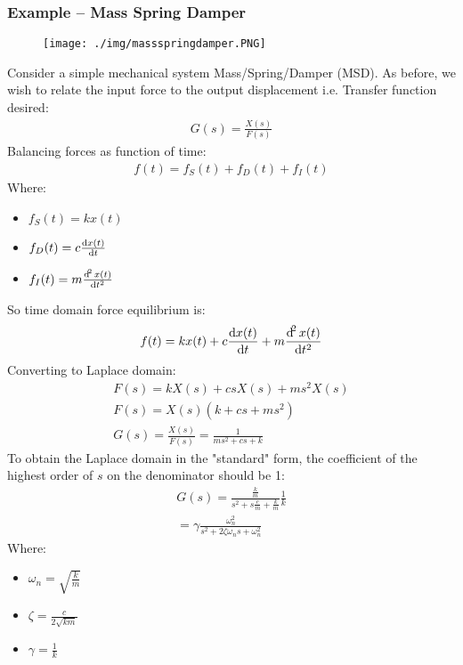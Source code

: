 \subsubsection*{Example – Mass Spring Damper}
\begin{figure}[H]
  \centering
  \texttt{[image: ./img/massspringdamper.PNG]}
\end{figure}
Consider a simple mechanical system Mass/Spring/Damper (MSD). As before, we wish to relate the input force to the output displacement i.e. Transfer function desired:
\begin{gather}
  G(s) = \frac{X(s)}{F(s)}
\end{gather}
Balancing forces as function of time:
\begin{gather}
  f(t) = f_S(t) + f_D(t) + f_I(t)
\end{gather}
Where:
\begin{itemize}
  \item $f_S(t) = kx(t)$
  \item $f_D(t) = c\frac{\dif x(t)}{\dif t}$
  \item $f_I(t) = m\frac{\dif^2 x(t)}{\dif t^2}$
\end{itemize}
So time domain force equilibrium is:
\begin{gather}
  f(t) = kx(t) + c\frac{\dif x(t)}{\dif t} + m\frac{\dif^2 x(t)}{\dif t^2}
\end{gather}
Converting to Laplace domain:
\begin{gather}
  F(s) = kX(s) + csX(s) + ms^2X(s) \\
  F(s) = X(s)(k + cs + ms^2) \\
  G(s) = \frac{X(s)}{F(s)} = \frac{1}{ms^2 + cs + k}
\end{gather}
To obtain the Laplace domain in the "standard" form, the coefficient of the highest order of $s$ on the denominator should be 1:
\begin{gather}
  G(s) = \frac{\frac{k}{m}}{s^2 + s\frac{c}{m} + \frac{k}{m}}\frac{1}{k} \\
  = \gamma \frac{\omega_n^2}{s^2 + 2\zeta \omega_n s + \omega_n^2}
\end{gather}
Where:
\begin{itemize}
  \item $\omega_n = \sqrt{\frac{k}{m}}$
  \item $\zeta = \frac{c}{2\sqrt{km}}$
  \item $\gamma = \frac{1}{k}$
\end{itemize}
